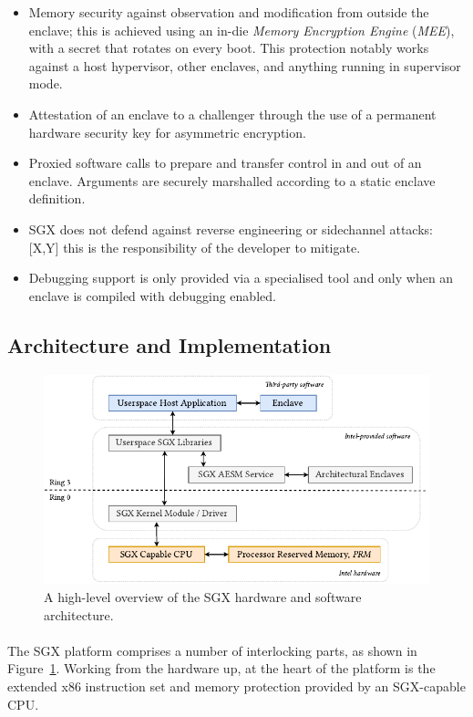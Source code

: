 \begin{itemize}
    \item Memory security against observation and modification from outside the enclave; this is achieved using an in-die \textit{Memory Encryption Engine} (\textit{MEE}), with a secret that rotates on every boot. This protection notably works against a host hypervisor, other enclaves, and anything running in supervisor mode.
    \item Attestation of an enclave to a challenger through the use of a permanent hardware security key for asymmetric encryption.
    \item Proxied software calls to prepare and transfer control in and out of an enclave. Arguments are securely marshalled according to a static enclave definition.
    \item SGX does not defend against reverse engineering or sidechannel attacks: [X,Y] this is the responsibility of the developer to mitigate.
    \item Debugging support is only provided via a specialised tool and only when an enclave is compiled with debugging enabled.
\end{itemize}

\subsection{Architecture and Implementation}

\begin{figure}[]
    \centering
    \includegraphics[width=0.9\linewidth]{figures/SGX-AdvArchitecture.pdf}
    \caption{A high-level overview of the SGX hardware and software architecture.}
    \label{fig:sgx-advarch}
\end{figure}

\paragraph{} The SGX platform comprises a number of interlocking parts, as shown in Figure~\ref{fig:sgx-advarch}. Working from the hardware up, at the heart of the platform is the extended x86 instruction set and memory protection provided by an SGX-capable CPU. 

